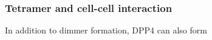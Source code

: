 \subsubsection{Tetramer and cell-cell interaction}

In addition to dimmer formation, DPP4 can also form 